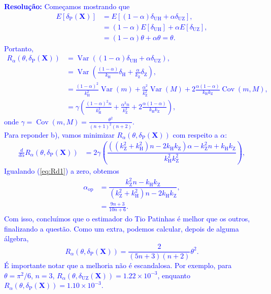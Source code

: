 \documentclass[a4paper,10pt, notitlepage]{report}
\newcommand{\vr}{\operatorname{Var}} %
\newcommand{\bX}{\boldsymbol{X}} %
\begin{document}
\textcolor{blue}{
\textbf{Resolução:}
Começamos mostrando que
\begin{align*}
 E[\delta_{\text{P}}(\bX)] &= E[(1-\alpha)\delta_{\text{UH}} + \alpha\delta_{\text{UZ}}],\\
 &= (1-\alpha)E[\delta_{\text{UH}}] + \alpha E[\delta_{\text{UZ}}],\\
 &= (1-\alpha)\theta + \alpha\theta = \theta.
\end{align*}
Portanto,
\begin{align*}
  R_{\alpha}(\theta, \delta_{\text{P}}(\bX)) &= \vr\left((1-\alpha)\delta_{\text{UH}} + \alpha\delta_{\text{UZ}}\right),\\
  &= \vr\left(\frac{(1-\alpha)}{k_{\text{H}}}\delta_{\text{H}} + \frac{\alpha}{k_{\text{Z}}}\delta_{\text{Z}}\right),\\
  &= \frac{(1-\alpha)^2}{k_{\text{H}}^2}\vr\left(m\right) + \frac{\alpha^2}{k_{\text{Z}}^2}\vr\left(M\right) + 2 \frac{\alpha(1-\alpha)}{k_{\text{H}}k_{\text{Z}}}\operatorname{Cov}(m, M),\\
  &= \gamma\left(\frac{(1-\alpha)^2n}{k_{\text{H}}^2}+ \frac{\alpha^2n}{k_{\text{Z}}^2}+ 2 \frac{\alpha(1-\alpha)}{k_{\text{H}}k_{\text{Z}}}\right),
\end{align*}
onde $\gamma = \operatorname{Cov}(m, M) = \frac{\theta^2}{(n+1)^2(n+2)}$.
\\
Para reponder b), vamos minimizar $ R_{\alpha}(\theta, \delta_{\text{P}}(\bX))$ com respeito a $\alpha$:
\begin{align}
\label{eq:Rd1}
 \frac{d}{d\alpha}  R_{\alpha}(\theta, \delta_{\text{P}}(\bX)) &= 2\gamma\left(\dfrac{\left(\left(k_{\text{Z}}^2+k_{\text{H}}^2\right)n-2k_{\text{H}}k_{\text{Z}}\right)\alpha-k_{\text{Z}}^2n+k_{\text{H}}k_{\text{Z}}}{k_{\text{H}}^2k_{\text{Z}}^2}\right),
\end{align}
Igualando (\ref{eq:Rd1}) a zero, obtemos
\begin{align*}
  \alpha_{\text{op}} &= \dfrac{k_{\text{Z}}^2n-k_{\text{H}}k_{\text{Z}}}{\left(k_{\text{Z}}^2+k_{\text{H}}^2\right)n-2k_{\text{H}}k_{\text{Z}}},\\
  &= \frac{9n+3}{10n+6}.
\end{align*}
Com isso, concluímos que o estimador do Tio Patinhas é melhor que os outros, finalizando a questão.
Como um extra, podemos calcular, depois de alguma álgebra,  
\begin{equation*}
 R_{\alpha}(\theta, \delta_{\text{P}}(\bX)) = \frac{2}{(5n+3)(n+2)}\theta^2.
\end{equation*}
É importante notar que a melhoria não é escandalosa. 
Por exemplo, para $\theta = \pi^2/6$, $n = 3$, $R_{\alpha}(\theta, \delta_{\text{UZ}}(\bX)) = 1.22 \times 10^{-3}$, enquanto $R_{\alpha}(\theta, \delta_{\text{P}}(\bX)) = 1.10 \times 10^{-3}$.
}


\end{document}
